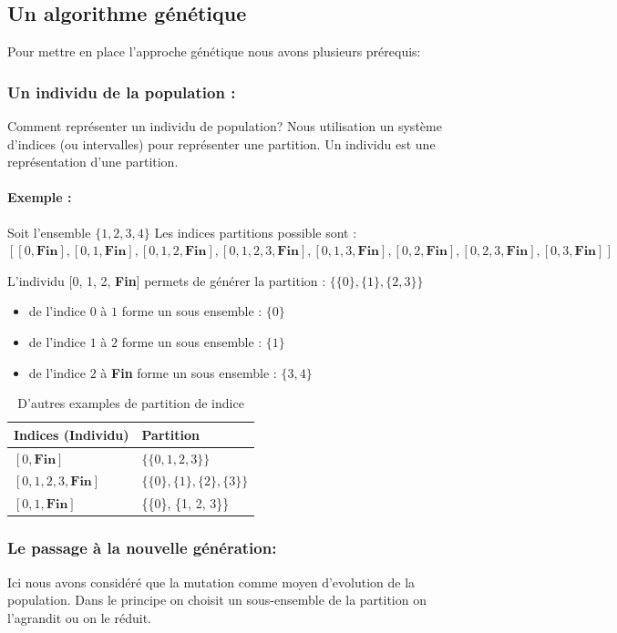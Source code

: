\documentclass[runningheads]{llncs}
\begin{document}
\subsection{Un algorithme g\'en\'etique}
Pour mettre en place l'approche génétique nous avons plusieurs prérequis:
\subsubsection{Un individu de la population :} Comment représenter un individu de population?
Nous utilisation un système d'indices (ou intervalles) pour représenter une partition. 
Un individu est une représentation d'une partition.

\paragraph{Exemple : } Soit l'ensemble $\{1, 2, 3, 4\}$ 
Les indices partitions possible sont :
$[[0, \textbf{Fin}], [0,1, \textbf{Fin}], [0,1, 2, \textbf{Fin}], [0,1, 2, 3, \textbf{Fin}], [0,1, 3, \textbf{Fin}], [0,2, \textbf{Fin}], [0,2, 3, \textbf{Fin}], [0,3, \textbf{Fin}]]$

L'individu [0, 1, 2, \textbf{Fin}] permets de générer la partition :  $\{\{0\}, \{1\}, \{2, 3\}\}$
\begin{itemize}
    \item de l'indice $0$ \`a $1$ forme un sous ensemble : $\{0\}$
    \item de l'indice $1$ \`a $2$ forme un sous ensemble : $\{1\}$
    \item de l'indice $2$ \`a \textbf{Fin} forme un sous ensemble : $\{3, 4\}$
\end{itemize}
\begin{table}[H]
\centering
\caption{D'autres examples de partition de indice}\label{tab1}
\begin{tabular}{|l|l|}
\hline
Indices (Individu) &  Partition \\
\hline
$[0, \textbf{Fin}]$&  $\{\{0, 1, 2, 3\}\}$\\
$[0,1, 2, 3, \textbf{Fin}]$ & $\{\{0\}, \{1\}, \{2\}, \{3\}\}$\\
$[0,1, \textbf{Fin}]$ & \{\{0\}, \{1, 2, 3\}\}\\
\hline
\end{tabular}
\end{table}

\subsubsection{Le passage à la nouvelle génération:}
Ici nous avons considéré que la mutation comme moyen 
d'evolution de la population. Dans le principe on choisit 
un sous-ensemble de la partition on l'agrandit ou on le réduit.
\end{document}
